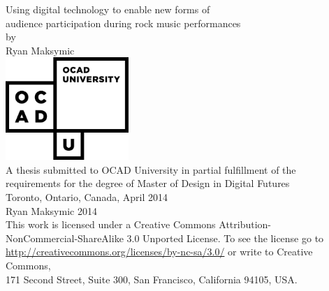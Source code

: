 \begin{titlepage}
\begin{center}

\LARGE{Using digital technology to enable new forms of\\audience participation during rock music performances}\\[0.5cm]
\large{by\\[0.5cm]
Ryan Maksymic}\\[2cm]
\includegraphics[width=0.35\textwidth]{ocadu_logo.png}\\[1.5cm]
\small{A thesis submitted to OCAD University in partial fulfillment of the\\
requirements for the degree of Master of Design in Digital Futures\\[1cm]
Toronto, Ontario, Canada, April 2014\\[1cm]
\ccLogo \hspace{0.05cm} Ryan Maksymic 2014\\[0.5cm]
This work is licensed under a Creative Commons Attribution-\\NonCommercial-ShareAlike 3.0 Unported License. To see the license go to \url{http://creativecommons.org/licenses/by-nc-sa/3.0/} or write to Creative Commons,\\171 Second Street, Suite 300, San Francisco, California 94105, USA.}

\end{center}
\end{titlepage}